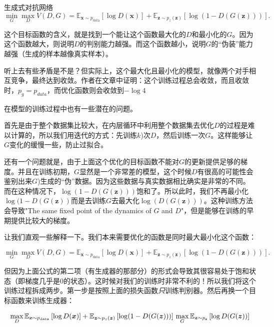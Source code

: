 \documentclass{ctexart}
\begin{document}
\begin{section}{生成式对抗网络}
		\begin{equation}
		\mathop{\min}_{G}\mathop{\max}_{D}V(D,G)=\mathbb{E}_{\bm{x}\sim p_{\text{data}}}\left[\log D(\bm{x})\right]+\mathbb{E}_{\bm{z}\sim p_z(\bm{z})}\left[\log(1-D(G(\bm{z})))\right].
		\end{equation}
		
		这个目标函数的含义，就是找到一个能让这个函数最大化的$D$和最小化的$G$。因为这个函数越大，则说明$D$的判别能力越强。而这个函数越小，说明$G$的“伪装”能力越强（生成的样本越像真实样本）。
		
		听上去有些矛盾是不是？但实际上，这个最大化且最小化的模型，就像两个对手相互竞争，最终达到收敛。作者在文章中证明：这个训练过程总会收敛，而且收敛时，$p_g=p_{data}$，而优化函数则会收敛到$-\log4$
		
		在模型的训练过程中也有一些潜在的问题。
		
		首先是由于整个数据集比较大，在内层循环中利用整个数据集去优化$D$的过程是难以计算的，所以我们用迭代的方式：先训练$k$)次$D$，然后训练一次$G$。这样能够让$G$变化的缓慢一些，防止过拟合。
		
		还有一个问题就是，由于上面这个优化的目标函数不能对$G$的更新提供足够的梯度。并且在训练初期，$G$显然是一个非常差的模型，这个时候$D$有很高的可能性会鉴别出来$G$)生成的“伪”数据。因为这些数据与真实数据相比确实是非常的不同。而在这种情况下，$\log(1-D(G(\boldsymbol{z})))$饱和了。所以此时，我们不再最小化$\log(1-D(G(\boldsymbol{z}))$而是去训练$G$去最大化$\log(D(G(\boldsymbol{z})))$。这种训练方法会导致"The same fixed point of the dynamics of $G$ and $D$"，但是能够在训练的早期提供比较大的梯度。
		
		让我们直观一些解释一下。我们本来需要优化的函数是同时最大最小化这个函数：
		
		\begin{equation}
			\mathop{\min}_{G}\mathop{\max}_{D}V(D,G)=\mathbb{E}_{\boldsymbol{x}\sim p_{\text{data}}}\left[\log D(\boldsymbol{x})\right]+\mathbb{E}_{\boldsymbol{z}\sim p_z(\boldsymbol{z})}\left[\log(1-D(G(\boldsymbol{z})))\right].
		\end{equation}
		
		但因为上面公式的第二项（有生成器的那部分）的形式会导致其很容易处于饱和状态（即梯度几乎是0的状态）。这时候对我们的训练时非常不利的！所以我们将这个训练过程拆成两步。第一步是按照上面的损失函数\emph{只}训练判别器。然后再换一个目标函数来训练生成器：
		
		\begin{equation}
			\mathop{\max}_{D}\mathbb{E}_{\boldsymbol{x}\sim p_{\text{data}}}\left[\log D(\boldsymbol{x})\right]+\mathbb{E}_{\boldsymbol{z}\sim p_z(\boldsymbol{z})}\left[\log(1-D(G(\boldsymbol{z})))\right]\\\\
			\mathop{\max}_{G}\mathbb{E}_{\boldsymbol{z}\sim p_{\text{z}}}\left[\log D(G(\boldsymbol{z}))\right]
		\end{equation}
		

\end{section}
\end{document}
